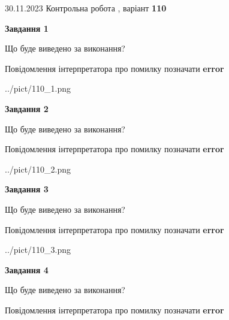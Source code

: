 \documentclass[12pt, ukrainian]{article}
\begin{document}
{{30.11.2023 Контрольна робота , варіант  \No \textbf { 110 }\par}}
{




{\begin {center}\textbf{Завдання 1}\end {center}}\par
Що буде виведено за виконання? \par
Повідомлення інтерпретатора про помилку позначати \textbf{error}

\begin{center}
	{../pict/110_1.png}
\end{center}
\newpage

{\begin {center}\textbf{Завдання 2}\end {center}}\par
Що буде виведено за виконання? \par
Повідомлення інтерпретатора про помилку позначати \textbf{error}

\begin{center}
	{../pict/110_2.png}
\end{center}
\newpage

{\begin {center}\textbf{Завдання 3}\end {center}}\par
Що буде виведено за виконання? \par
Повідомлення інтерпретатора про помилку позначати \textbf{error}

\begin{center}
	{../pict/110_3.png}
\end{center}
\newpage

{\begin {center}\textbf{Завдання 4}\end {center}}\par
Що буде виведено за виконання? \par
Повідомлення інтерпретатора про помилку позначати \textbf{error}

}
\end{document}
